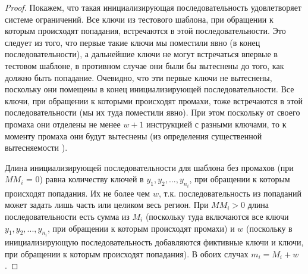 \begin{proof}
  Покажем, что такая инициализирующая последовательность удовлетворяет системе ограничений. Все ключи из тестового шаблона, при обращении к которым происходят попадания, встречаются в
  этой последовательности. Это следует из того, что первые такие ключи мы поместили явно (в конец последовательности), а дальнейшие ключи не могут встречаться впервые в тестовом шаблоне, в противном случае они были бы вытеснены до того, как должно быть попадание. Очевидно, что эти первые ключи не вытеснены, поскольку они помещены в конец инициализирующей последовательности. Все ключи, при обращении к которыми происходят промахи, тоже встречаются в этой последовательности (мы их туда поместили явно). При этом поскольку от своего промаха они отделены не менее $w+1$ инструкцией с разными ключами, то к моменту промаха они будут вытеснены (из определения существенной вытесняемости \LRU).

  Длина инициализирующей последовательности для шаблона без промахов (при $MM_i$ = 0) равна количеству ключей в $y_1, y_2, ..., y_{n_i}$, при обращении к
  которым происходят попадания. Их не более чем $w$,
  т.к. последовательность из попаданий может задать лишь часть
  или целиком весь регион. При $MM_i > 0$ длина последовательности
  есть сумма из $M_i$ (поскольку туда включаются все ключи $y_1, y_2,
  ..., y_{n_i}$, при обращении к которым происходят промахи) и
  $w$ (поскольку в инициализирующую последовательность добавляются фиктивные ключи и ключи, при обращении к которым происходят попадания). В обоих случах $m_i = M_i + w$.
\end{proof}


